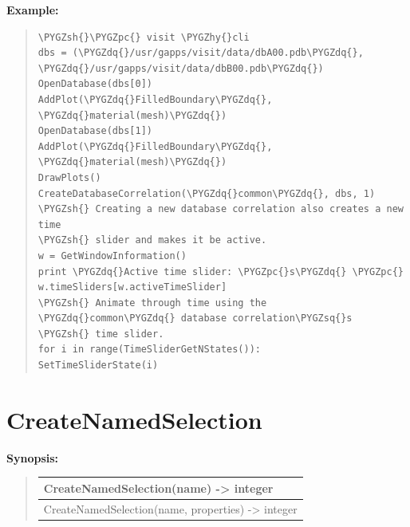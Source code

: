 \documentclass[letterpaper,10pt,english]{sphinxmanual}
\def\PYGZsh{\char`\#}
\def\PYGZpc{\char`\%}
\def\PYGZhy{\char`\-}
\def\PYGZsq{\char`\'}
\def\PYGZdq{\char`\"}
\renewcommand\PYGZsq{\textquotesingle}
\begin{document}
\begin{DUlineblock}{0em}
\item[] 
\end{DUlineblock}

\begin{DUlineblock}{0em}
\item[] \textbf{Example:}
\item[] 
\end{DUlineblock}
\begin{quote}

\begin{Verbatim}[commandchars=\\\{\}]
\PYGZsh{}\PYGZpc{} visit \PYGZhy{}cli
dbs = (\PYGZdq{}/usr/gapps/visit/data/dbA00.pdb\PYGZdq{},
\PYGZdq{}/usr/gapps/visit/data/dbB00.pdb\PYGZdq{})
OpenDatabase(dbs[0])
AddPlot(\PYGZdq{}FilledBoundary\PYGZdq{}, \PYGZdq{}material(mesh)\PYGZdq{})
OpenDatabase(dbs[1])
AddPlot(\PYGZdq{}FilledBoundary\PYGZdq{}, \PYGZdq{}material(mesh)\PYGZdq{})
DrawPlots()
CreateDatabaseCorrelation(\PYGZdq{}common\PYGZdq{}, dbs, 1)
\PYGZsh{} Creating a new database correlation also creates a new time
\PYGZsh{} slider and makes it be active.
w = GetWindowInformation()
print \PYGZdq{}Active time slider: \PYGZpc{}s\PYGZdq{} \PYGZpc{} w.timeSliders[w.activeTimeSlider]
\PYGZsh{} Animate through time using the \PYGZdq{}common\PYGZdq{} database correlation\PYGZsq{}s
\PYGZsh{} time slider.
for i in range(TimeSliderGetNStates()):
SetTimeSliderState(i)
\end{Verbatim}
\end{quote}


\section{CreateNamedSelection}
\label{functions:createnamedselection}
\begin{DUlineblock}{0em}
\item[] \textbf{Synopsis:}
\end{DUlineblock}
\begin{quote}

\begin{tabulary}{\linewidth}{|L|}
\hline

CreateNamedSelection(name) -\textgreater{} integer
\\
\hline
CreateNamedSelection(name, properties) -\textgreater{} integer
\\
\hline\end{tabulary}

\end{quote}
\end{document}
